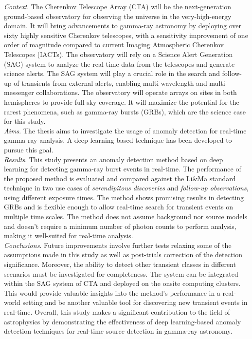 \textit{Context}. The Cherenkov Telescope Array (CTA) will be the next-generation ground-based observatory for observing the universe in the very-high-energy domain. It will bring advancements to gamma-ray astronomy by deploying over sixty highly sensitive Cherenkov telescopes, with a sensitivity improvement of one order of magnitude compared to current Imaging Atmospheric Cherenkov Telescopes (IACTs). The observatory will rely on a Science Alert Generation (SAG) system to analyze the real-time data from the telescopes and generate science alerts. The SAG system will play a crucial role in the search and follow-up of transients from external alerts, enabling multi-wavelength and multi-messenger collaborations. The observatory will operate arrays on sites in both hemispheres to provide full sky coverage. It will maximize the potential for the rarest phenomena, such as gamma-ray bursts (GRBs), which are the science case for this study.\\
\textit{Aims}. The thesis aims to investigate the usage of anomaly detection for real-time gamma-ray analysis. A deep learning-based technique has been developed to pursue this goal.\\
\textit{Results}. This study presents an anomaly detection method based on deep learning for detecting gamma-ray burst events in real-time. The performance of the proposed method is evaluated and compared against the Li\&Ma standard technique in two use cases of \textit{serendipitous discoveries} and \textit{follow-up observations}, using different exposure times. The method shows promising results in detecting GRBs and is flexible enough to allow real-time search for transient events on multiple time scales. The method does not assume background nor source models and doesn't require a minimum number of photon counts to perform analysis, making it well-suited for real-time analysis.\\
\textit{Conclusions}. Future improvements involve further tests relaxing some of the assumptions made in this study as well as post-trials correction of the detection significance. Moreover, the ability to detect other transient classes in different scenarios must be investigated for completeness. The system can be integrated within the SAG system of CTA and deployed on the onsite computing clusters. This would provide valuable insights into the method's performance in a real-world setting and be another valuable tool for discovering new transient events in real-time. Overall, this study makes a significant contribution to the field of astrophysics by demonstrating the effectiveness of deep learning-based anomaly detection techniques for real-time source detection in gamma-ray astronomy.